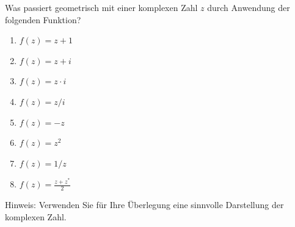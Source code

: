 \begin{ExerciseBlock}
Was passiert geometrisch mit einer komplexen Zahl $z$ durch Anwendung der folgenden Funktion?

\begin{enumerate}[label=\alph*)]
	\item $f(z) = z+1$
	\item $f(z) = z+i$	
	\item $f(z) = z \cdot i$
	\item $f(z) = z/i$
	\item $f(z) = -z$
	\item $f(z) = z^2$
	\item $f(z) = 1/z$
	\item $f(z) = \frac{z+z^*}{2}$
\end{enumerate}
Hinweis: Verwenden Sie für Ihre Überlegung eine sinnvolle Darstellung der komplexen Zahl.

\end{ExerciseBlock}
